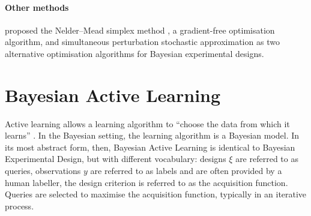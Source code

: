 \documentclass[a4paper, 10pt]{report}
\theoremstyle{plain}
\begin{document}
	
	\paragraph{Other methods}
	\citet{huan2013simulation} proposed the Nelder--Mead simplex method \citep{nelder1965simplex}, a gradient-free optimisation algorithm, and simultaneous perturbation stochastic approximation \citep{spall1998overview} as two alternative optimisation algorithms for Bayesian experimental designs.
	
	
	
	
	
	
	
	
	
	
	\section{Bayesian Active Learning}
	\label{sec:bal}
	Active learning allows a learning algorithm to ``choose the data from which it learns'' \citep{settles2009active}.
	In the Bayesian setting, the learning algorithm is a Bayesian model.
	In its most abstract form, then, Bayesian Active Learning is identical to Bayesian Experimental Design, but with different vocabulary: designs $\xi$ are referred to as queries,
	observations $y$ are referred to as labels and are often provided by a human labeller, the design criterion is referred to as the acquisition function. Queries are selected to maximise the acquisition function, typically in an iterative process.
	
\end{document}

